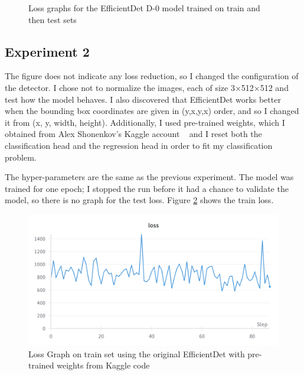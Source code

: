 \begin{figure}[!ht]
    \caption{Loss graphs for the EfficientDet D-0 model trained on train and then test sets}
    \label{fig:fig23}
\end{figure}

\subsection{Experiment 2}

The figure does not indicate any loss reduction, so I changed the configuration of the detector. I chose not to normalize the images, each of size 3$\times$512$\times$512 and test how the model behaves. I also discovered that EfficientDet works better when the bounding box coordinates are given in (y,x,y,x) order, and so I changed it from (x, y, width, height). Additionally, I used pre-trained weights, which I obtained from Alex Shonenkov's Kaggle account ~\cite{link6} and I reset both the classification head and the regression head in order to fit my classification problem. 

The hyper-parameters are the same as the previous experiment. The model was trained for one epoch; I stopped the run before it had a chance to validate the model, so there is no graph for the test loss. Figure \ref{fig:fig24} shows the train loss.

\begin{figure}[!ht]
    \centering
    \includegraphics[width=1\linewidth]{figures/Figure27.png}
    \caption{Loss Graph on train set using the original EfficientDet with pre-trained weights from Kaggle code}
    \label{fig:fig24}
\end{figure}

